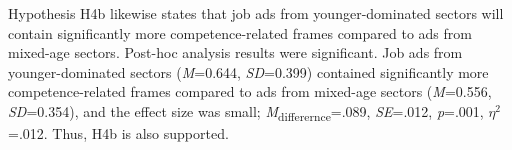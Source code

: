 \documentclass[Royal,sageapa,times]{sagej}
\begin{document}
\begin{table}[ht]
    \small\sf\centering
    \caption{\textit{Games-Howell post-hoc comparisons for age-segregated sectors and competence-related frames}}
    \label{table8}
    \vskip 4pt
    \end{table}

Hypothesis H4b likewise states that job ads from younger-dominated sectors will contain significantly more competence-related frames compared to ads from mixed-age sectors. Post-hoc analysis results were significant. Job ads from younger-dominated sectors (\textit{M}=0.644, \textit{SD}=0.399) contained significantly more competence-related frames compared to ads from mixed-age sectors (\textit{M}=0.556, \textit{SD}=0.354), and the effect size was small; \textit{M}\textsubscript{differernce}=.089, \textit{SE}=.012, \textit{p}=.001, \textit{$\eta^2$}=.012. Thus, H4b is also supported.
\end{document}
